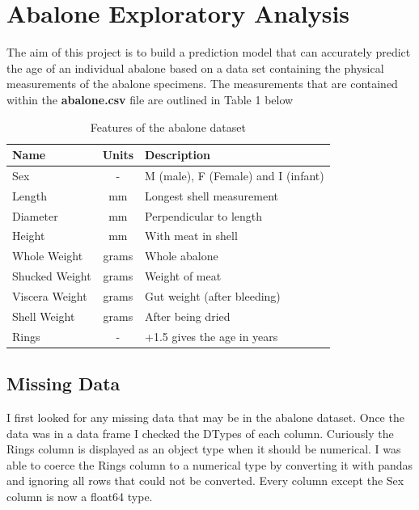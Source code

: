 \section{Abalone Exploratory Analysis}

The aim of this project is to build a prediction model that can accurately predict the age of an individual abalone based on a data set containing the physical measurements of the abalone specimens. The measurements that are contained within the \textbf{abalone.csv }file are outlined in Table 1 below

\begin{table}[H]
\centering
\caption{Features of the abalone dataset}
\label{my-label}
\begin{tabular}{|l|c|l|}
\hline
Name           & \multicolumn{1}{l|}{Units} & Description                         \\ \hline
Sex            & -                          & M (male), F (Female) and I (infant) \\ \hline
Length         & mm                         & Longest shell measurement           \\ \hline
Diameter       & mm                         & Perpendicular to length             \\ \hline
Height         & mm                         & With meat in shell                  \\ \hline
Whole Weight   & grams                      & Whole abalone                       \\ \hline
Shucked Weight & grams                      & Weight of meat                      \\ \hline
Viscera Weight & grams                      & Gut weight (after bleeding)         \\ \hline
Shell Weight   & grams                      & After being dried                   \\ \hline
Rings          & -                          & +1.5 gives the age in years         \\ \hline
\end{tabular}
\end{table}

\subsection{Missing Data}

I first looked for any missing data that may be in the abalone dataset. Once the data was in a data frame I checked the DTypes of each column. Curiously the Rings column is displayed as an object type when it should be numerical. I was able to coerce the Rings column to a numerical type by converting it with pandas and ignoring all rows that could not be converted. Every column except the Sex column is now a float64 type.
 
